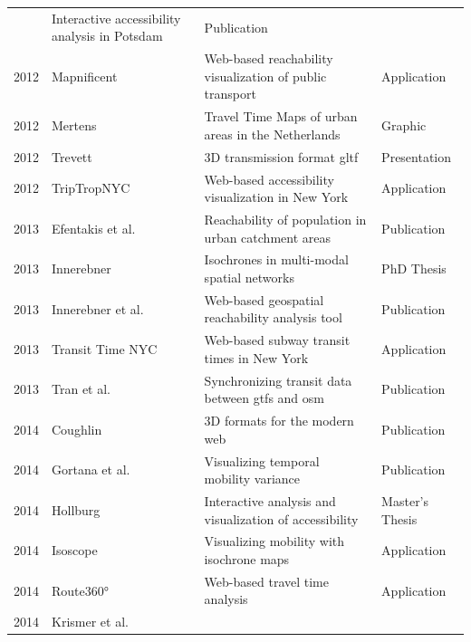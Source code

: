 \begin{table}[htp]
\begin{tabular}{r|l|l|l}
        & Interactive accessibility analysis in Potsdam
        & Publication \\
      2012
        & Mapnificent \cite{Mapnificent}
        & Web-based reachability visualization of public transport
        & Application \\
      2012
        & Mertens \cite{meertens2012}
        & Travel Time Maps of urban areas in the Netherlands
        & Graphic \\
      2012
        & Trevett \cite{Trevett2012}
        & 3D transmission format \acrshort{gltf}
        & Presentation \\
      2012
        & TripTropNYC \cite{TriptropNYC}
        & Web-based accessibility visualization in New York
        & Application \\
      2013
        & Efentakis et al. \cite{efentakis2013isochrones}
        & Reachability of population in urban catchment areas
        & Publication \\
      2013
        & Innerebner \cite{Innerebner2013}
        & Isochrones in multi-modal spatial networks
        & PhD Thesis \\
      2013
        & Innerebner et al. \cite{innerebner2013isoga}
        & Web-based geospatial reachability analysis tool
        & Publication \\
      2013
        & Transit Time NYC \cite{TransitTimeNYC}
        & Web-based subway transit times in New York
        & Application \\
      2013
        & Tran et al. \cite{tran2013go_sync}
        & Synchronizing transit data between \acrshort{gtfs} and \acrshort{osm}
        & Publication \\
      2014
        & Coughlin \cite{Coughlin2014}
        & 3D formats for the modern web
        & Publication \\
      2014
        & Gortana et al. \cite{gortanaisoscope}
        & Visualizing temporal mobility variance
        & Publication \\
      2014
        & Hollburg \cite{Hollburg2014}
        & Interactive analysis and visualization of accessibility
        & Master's Thesis \\
      2014
        & Isoscope \cite{Isoscope}
        & Visualizing mobility with isochrone maps
        & Application \\
      2014
        & Route360° \cite{Route360}
        & Web-based travel time analysis
        & Application \\
      2014
        & Krismer et al. \cite{krismer2014incremental}

\end{tabular}
\end{table}
